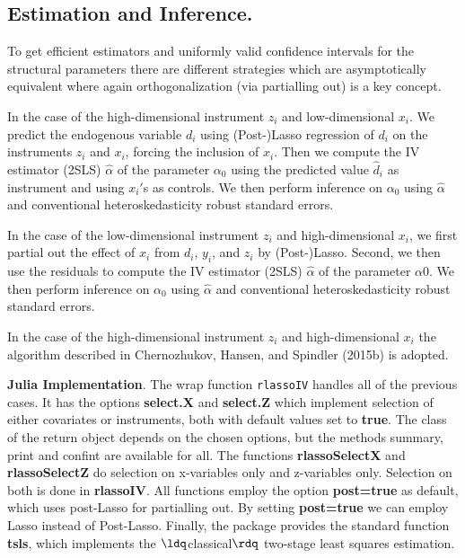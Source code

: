 \documentclass[12pt,a4paper]{article}
\begin{document}
\subsection{Estimation and Inference.}
To get efficient estimators and uniformly valid confidence intervals for the structural parameters there are different strategies which are asymptotically equivalent where again orthogonalization (via partialling out) is a key concept.

In the case of the high-dimensional instrument $z_i$ and low-dimensional $x_i$. We predict the endogenous variable $d_i$ using (Post-)Lasso regression of $d_i$ on the instruments $z_i$ and $x_i$, forcing the inclusion of $x_i$. Then we compute the IV estimator (2SLS) $\hat \alpha$ of the parameter $\alpha_0$ using the predicted value $\hat{d}_i$ as instrument and using $x_i'$s as controls. We then perform inference on $\alpha_0$ using $\hat{\alpha}$ and conventional heteroskedasticity robust standard errors.

In the case of the low-dimensional instrument $z_i$ and high-dimensional $x_i$, we first partial out the effect of $x_i$ from $d_i$, $y_i$, and $z_i$ by (Post-)Lasso. Second, we then use the residuals to compute the IV estimator (2SLS) $\hat{\alpha}$ of the parameter \ensuremath{\alpha}0. We then perform inference on $\alpha_0$ using $\hat{\alpha}$ and conventional heteroskedasticity robust standard errors. 

In the case of the high-dimensional instrument $z_i$ and high-dimensional $x_i$ the algorithm described in Chernozhukov, Hansen, and Spindler (2015b) is adopted.

\textbf{Julia Implementation}. The wrap function \texttt{rlassoIV} handles all of the previous cases. It has the options \textbf{select.X} and \textbf{select.Z} which implement selection of either covariates or instruments, both with default values set to \textbf{true}. The class of the return object depends on the chosen options, but the methods summary, print and confint are available for all. The functions \textbf{rlassoSelectX} and \textbf{rlassoSelectZ} do selection on x-variables only and z-variables only. Selection on both is done in \textbf{rlassoIV}. All functions employ the option \textbf{post=true} as default, which uses post-Lasso for partialling out. By setting \textbf{post=true} we can employ Lasso instead of Post-Lasso. Finally, the package provides the standard function \textbf{tsls}, which implements the \ensuremath{\ldq}classical\ensuremath{\rdq} two-stage least squares estimation.
\end{document}
